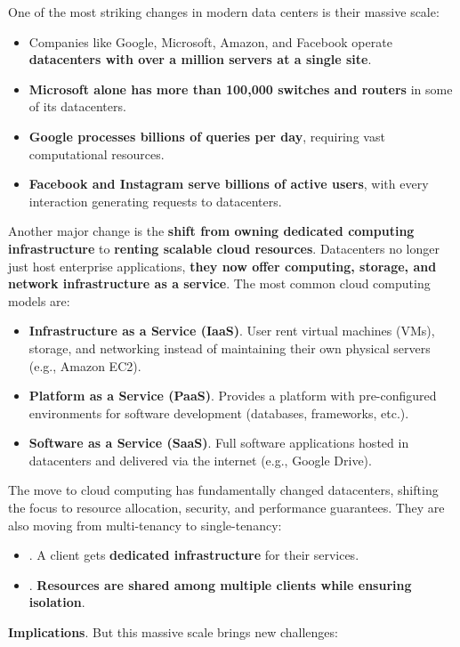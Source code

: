 \noindent
One of the most striking changes in modern data centers is their massive scale:
\begin{itemize}
    \item Companies like Google, Microsoft, Amazon, and Facebook operate \textbf{datacenters with over a million servers at a single site}.
    \item \textbf{Microsoft alone has more than 100,000 switches and routers} in some of its datacenters.
    \item \textbf{Google processes billions of queries per day}, requiring vast computational resources.
    \item \textbf{Facebook and Instagram serve billions of active users}, with every interaction generating requests to datacenters.
\end{itemize}
Another major change is the \textbf{shift from owning dedicated computing infrastructure} to \textbf{renting scalable cloud resources}. Datacenters no longer just host enterprise applications, \textbf{they now offer computing, storage, and network infrastructure as a service}. The most common cloud computing models are:
\begin{itemize}
    \item \textbf{Infrastructure as a Service (IaaS)}. User rent virtual machines (VMs), storage, and networking instead of maintaining their own physical servers (e.g., Amazon EC2).
    \item \textbf{Platform as a Service (PaaS)}. Provides a platform with pre-configured environments for software development (databases, frameworks, etc.).
    \item \textbf{Software as a Service (SaaS)}. Full software applications hosted in datacenters and delivered via the internet (e.g., Google Drive).
\end{itemize}
The move to cloud computing has fundamentally changed datacenters, shifting the focus to resource allocation, security, and performance guarantees. They are also moving from multi-tenancy to single-tenancy:
\begin{itemize}
    \item {}. A client gets \textbf{dedicated infrastructure} for their services.
    \item {}. \textbf{Resources are shared among multiple clients while ensuring isolation}.
\end{itemize}
\textcolor{Red2}{ \textbf{Implications}}. But this massive scale brings new challenges:
